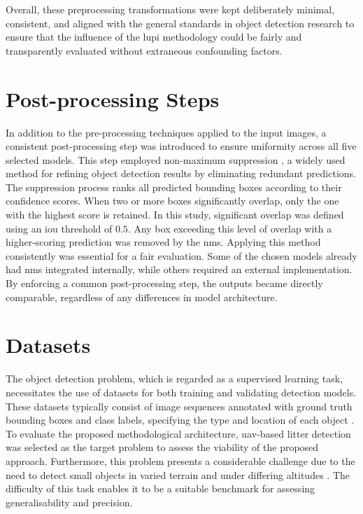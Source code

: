 Overall, these preprocessing transformations were kept deliberately minimal, consistent, and aligned with the general standards in object detection research to ensure that the influence of the \gls{lupi} methodology could be fairly and transparently evaluated without extraneous confounding factors.

\section{Post-processing Steps}
\label{sec:4_postprocessing}

In addition to the pre-processing techniques applied to the input images, a consistent post-processing step was introduced to ensure uniformity across all five selected models. This step employed non-maximum suppression \cite{nms}, a widely used method for refining object detection results by eliminating redundant predictions.
The suppression process ranks all predicted bounding boxes according to their confidence scores. When two or more boxes significantly overlap, only the one with the highest score is retained. In this study, significant overlap was defined using an \gls{iou} threshold of $0.5$. Any box exceeding this level of overlap with a higher-scoring prediction was removed by the \gls{nms}.
Applying this method consistently was essential for a fair evaluation. Some of the chosen models already had \gls{nms} integrated internally, while others required an external implementation. By enforcing a common post-processing step, the outputs became directly comparable, regardless of any differences in model architecture.

\section{Datasets}
\label{sec:4_datasets}

The object detection problem, which is regarded as a supervised learning task, necessitates the use of datasets for both training and validating detection models. These datasets typically consist of image sequences annotated with ground truth bounding boxes and class labels, specifying the type and location of each object \cite{pascal-voc-2012, coco}.
To evaluate the proposed methodological architecture, \gls{uav}-based litter detection was selected as the target problem to assess the viability of the proposed approach. Furthermore, this problem presents a considerable challenge due to the need to detect small objects in varied terrain and under differing altitudes \cite{soda_dataset}. The difficulty of this task enables it to be a suitable benchmark for assessing generalisability and precision.

